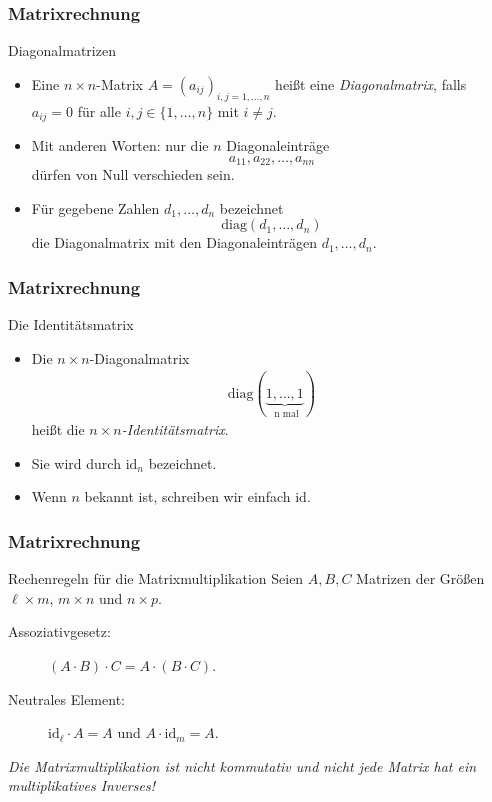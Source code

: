 \documentclass{beamer}
\renewcommand{\emph}[1]{{\textcolor{solarizedRed}{\itshape #1}}}
\newcommand{\id}{\mathrm{id}}
\newcommand{\diag}{\mathrm{diag}}
\renewcommand{\ae}{\"a}
\renewcommand{\oe}{\"o}
\newcommand{\ue}{\"u}
\newcommand{\mytitle}{Matrixrechnung}
\begin{document}
\begin{frame}\frametitle{\mytitle}
	\begin{block}{Diagonalmatrizen}
		\begin{itemize}
			\item Eine $n\times n$-Matrix $A=(a_{ij})_{i,j=1,\ldots,n}$ hei\ss t eine \emph{Diagonalmatrix}, falls $a_{ij}=0$ f\ue r alle $i,j\in\{1,\ldots,n\}$ mit $i\neq j$.
		\item Mit anderen Worten: nur die $n$ Diagonaleintr\ae ge $$a_{11},a_{22},\ldots,a_{nn}$$ d\ue rfen von Null verschieden sein.
		\item F\ue r gegebene Zahlen $d_1,\ldots,d_n$ bezeichnet
			$$\diag(d_1,\ldots,d_n)$$
			die Diagonalmatrix mit den Diagonaleintr\ae gen $d_1,\ldots,d_n$.
		\end{itemize}
	\end{block}
\end{frame}

\begin{frame}\frametitle{\mytitle}
	\begin{block}{Die Identit\ae tsmatrix}
		\begin{itemize}
			\item Die $n\times n$-Diagonalmatrix
				\begin{align*}
					\diag(\underbrace{1,\ldots,1}_{\mbox{ n mal}})
				\end{align*}
				hei\ss t die \emph{$n\times n$-Identit\ae tsmatrix}.
			\item Sie wird durch $\id_n$ bezeichnet.
			\item Wenn $n$ bekannt ist, schreiben wir einfach $\id$.
		\end{itemize}
	\end{block}
\end{frame}

\begin{frame}\frametitle{\mytitle}
	\begin{block}{Rechenregeln f\ue r die Matrixmultiplikation}
Seien $A,B,C$ Matrizen der Gr\oe\ss en $\ell\times m$, $m\times n$ und $n\times p$.
		\begin{description}
			\item[Assoziativgesetz:] $(A\cdot B)\cdot C=A\cdot(B\cdot C)$.
			\item[Neutrales Element:] $\id_\ell\cdot A=A$ und $A\cdot\id_m=A$.
		\end{description}
		\emph{Die Matrixmultiplikation ist nicht kommutativ und nicht jede Matrix hat ein multiplikatives Inverses!}
	\end{block}
\end{frame}
\end{document}
